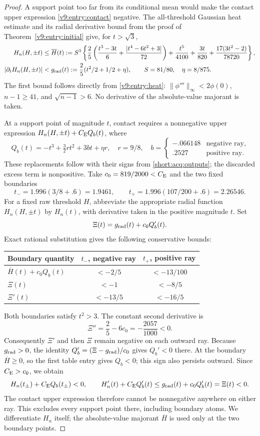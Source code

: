 \begin{proof}
A support point too far from its conditional mean would make the
contact upper expression \eqref{v9:entry:contact} negative. The
all-threshold Gaussian heat estimate and its radial derivative bound
from the proof of Theorem~\ref{v9:entry:initial} give, for $t>\sqrt3$,
\begin{align*}
 H_n(H,\pm t)&\le \overline H(t):=S^3\left\{\frac25\left(
 \frac{t^3-3t}{6}+\frac{|t^4-6t^2+3|}{72}\right)
 +\frac{t^5}{4100}+\frac{3t}{820}
 +\frac{17(3t^2-2)}{78720}\right\},\\
 |\partial_t H_n(H,\pm t)|&<g_{\rm rad}(t):=\frac25(t^2/2+1/2+\eta),
 \qquad S=81/80,\quad\eta=8/875.
\end{align*}
The first bound follows directly from \eqref{v9:entry:heat}:
$\|\phi'''\|_\infty<2\phi(0)$, $n-1\ge41$, and
$\sqrt{n-1}>6$. No derivative of the absolute-value majorant is taken.

At a support point of magnitude $t$, contact requires a nonnegative upper
expression $H_n(H,\pm t)+C_{\mathrm E} Q_b(t)$, where
\[
 Q_b(t)=-t^3+\tfrac32rt^2+3bt+\eta r,
 \quad r=9/8,
 \quad b=\begin{cases}-.066148&\text{negative ray},\\
                         .2527&\text{positive ray}.
          \end{cases}
\]
These replacements follow with their signs from
\eqref{short:acq:outputs}; the discarded excess term is nonpositive.
Take $c_0=819/2000<C_{\mathrm E}$ and the two fixed boundaries
\[
 t_-=1.996(3/8+.6)=1.9461,
 \qquad t_+=1.996(107/200+.6)=2.26546.
\]
For a fixed raw threshold $H$, abbreviate the appropriate radial
function $H_n(H,\pm t)$ by $H_n(t)$, with derivative taken in the
positive magnitude $t$. Set
\[
 \Xi(t)=g_{\rm rad}(t)+c_0Q_b'(t).
\]
Exact rational substitution gives the following conservative bounds:
\begin{center}
\begin{tabular}{@{}lcc@{}}
\toprule
Boundary quantity & $t_-$, negative ray & $t_+$, positive ray \\
\midrule
$\overline H(t)+c_0Q_b(t)$ & $<-2/5$ & $<-13/100$ \\
$\Xi(t)$ & $<-1$ & $<-8/5$ \\
$\Xi'(t)$ & $<-13/5$ & $<-16/5$ \\
\bottomrule
\end{tabular}
\end{center}
Both boundaries satisfy $t^2>3$. The constant second derivative is
\[
 \Xi''=\frac25-6c_0=-\frac{2057}{1000}<0.
\]
Consequently $\Xi'$ and then $\Xi$ remain negative on each outward ray.
Because $g_{\rm rad}>0$, the identity $Q_b'=(\Xi-g_{\rm rad})/c_0$ gives $Q_b'<0$ there.
At the boundary $\overline H\ge0$, so the first table entry gives $Q_b<0$;
this sign also persists outward. Since $C_{\mathrm E}>c_0$, we obtain
\[
 H_n(t_\pm)+C_{\mathrm E} Q_b(t_\pm)<0,\qquad
 H_n'(t)+C_{\mathrm E} Q_b'(t)\le g_{\rm rad}(t)+c_0Q_b'(t)=\Xi(t)<0.
\]
The contact upper expression therefore cannot be nonnegative anywhere
on either ray. This excludes every support point there, including
boundary atoms. We differentiate $H_n$ itself; the absolute-value
majorant $\overline H$ is used only at the two boundary points.


\end{proof}
